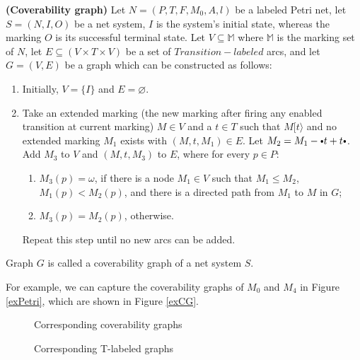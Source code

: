\documentclass{llncs}
\begin{document}
\begin{definition}\textbf{(Coverability graph)}\label{def:cg}
Let $N=(P,T,F,M_{0},A,l)$ be a labeled Petri net, let $S=(N,I,O)$ be a net system, $I$ is the system's initial state,
whereas the marking $O$ is its successful terminal state. Let $V\subseteq \mathbb{M}$ where $\mathbb{M}$ is the marking set of $N$, let $E\subseteq(V\times T\times V)$ be a set of $Transition-labeled$ arcs, and let $G=(V,E)$ be a graph which can be constructed as follows:
\begin{enumerate}
	\item Initially, $V=\{I\}$ and $E=\varnothing$.
	\item Take an extended marking (the new marking after firing any enabled transition at current marking) $M\in V$ and a $t\in T$ such that $M[t\rangle$ and no extended marking $M_{1}$ exists with $(M,t,M_{1})\in E$. Let $M_{2}=M_{1}-\vcenter{\hbox{\tiny$\bullet$}} t+t\vcenter{\hbox{\tiny$\bullet$}}$. Add $M_{3}$ to $V$ and $(M,t,M_{3})$ to $E$, where for every $p\in P$:
	\begin{enumerate}
		\item $M_{3}(p)=\omega$, if there is a node $M_{1}\in V$ such that $M_{1}\leq M_{2}$, $M_{1}(p)<M_{2}(p)$, and there is a directed path from $M_{1}$ to $M$ in $G$;
		\item $M_{3}(p)=M_{2}(p)$, otherwise.
	\end{enumerate}
	Repeat this step until no new arcs can be added.
\end{enumerate}
Graph $G$ is called a coverability graph of a net system $S$.
\end{definition}
For example, we can capture the coverability graphs of $M_{0}$ and $M_{4}$ in Figure \ref{exPetri}, which are shown in Figure \ref{exCG}.

\begin{figure}[!htb]
\begin{minipage}[t]{0.5\textwidth}
	\centering
	\hspace{0.3in}
	
	\caption{Corresponding coverability graphs \label{exCG}}
\end{minipage}
\hspace{0.1in}
\begin{minipage}[t]{0.5\textwidth}
	\centering
	\hspace{0.3in}
	
	\caption{Corresponding T-labeled graphs \label{exTG}}
\end{minipage}
\end{figure}
\end{document}

